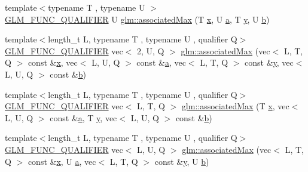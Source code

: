 \begin{DoxyCompactItemize}
\item 
{\footnotesize template$<$typename T , typename U $>$ }\\\hyperlink{setup_8hpp_a33fdea6f91c5f834105f7415e2a64407}{G\+L\+M\+\_\+\+F\+U\+N\+C\+\_\+\+Q\+U\+A\+L\+I\+F\+I\+ER} U \hyperlink{group__gtx__associated__min__max_ga7d9c8785230c8db60f72ec8975f1ba45}{glm\+::associated\+Max} (T \hyperlink{_s_d_l__opengl_8h_ad0e63d0edcdbd3d79554076bf309fd47}{x}, U \hyperlink{_s_d_l__opengl__glext_8h_a3309789fc188587d666cda5ece79cf82}{a}, T \hyperlink{_s_d_l__opengl_8h_a1675d9d7bb68e1657ff028643b4037e3}{y}, U \hyperlink{_s_d_l__opengl__glext_8h_a0f71581a41fd2264c8944126dabbd010}{b})
\item 
{\footnotesize template$<$length\+\_\+t L, typename T , typename U , qualifier Q$>$ }\\\hyperlink{setup_8hpp_a33fdea6f91c5f834105f7415e2a64407}{G\+L\+M\+\_\+\+F\+U\+N\+C\+\_\+\+Q\+U\+A\+L\+I\+F\+I\+ER} vec$<$ 2, U, Q $>$ \hyperlink{group__gtx__associated__min__max_ga5c6758bc50aa7fbe700f87123a045aad}{glm\+::associated\+Max} (vec$<$ L, T, Q $>$ const \&\hyperlink{_s_d_l__opengl_8h_ad0e63d0edcdbd3d79554076bf309fd47}{x}, vec$<$ L, U, Q $>$ const \&\hyperlink{_s_d_l__opengl__glext_8h_a3309789fc188587d666cda5ece79cf82}{a}, vec$<$ L, T, Q $>$ const \&\hyperlink{_s_d_l__opengl_8h_a1675d9d7bb68e1657ff028643b4037e3}{y}, vec$<$ L, U, Q $>$ const \&\hyperlink{_s_d_l__opengl__glext_8h_a0f71581a41fd2264c8944126dabbd010}{b})
\item 
{\footnotesize template$<$length\+\_\+t L, typename T , typename U , qualifier Q$>$ }\\\hyperlink{setup_8hpp_a33fdea6f91c5f834105f7415e2a64407}{G\+L\+M\+\_\+\+F\+U\+N\+C\+\_\+\+Q\+U\+A\+L\+I\+F\+I\+ER} vec$<$ L, T, Q $>$ \hyperlink{group__gtx__associated__min__max_ga0d169d6ce26b03248df175f39005d77f}{glm\+::associated\+Max} (T \hyperlink{_s_d_l__opengl_8h_ad0e63d0edcdbd3d79554076bf309fd47}{x}, vec$<$ L, U, Q $>$ const \&\hyperlink{_s_d_l__opengl__glext_8h_a3309789fc188587d666cda5ece79cf82}{a}, T \hyperlink{_s_d_l__opengl_8h_a1675d9d7bb68e1657ff028643b4037e3}{y}, vec$<$ L, U, Q $>$ const \&\hyperlink{_s_d_l__opengl__glext_8h_a0f71581a41fd2264c8944126dabbd010}{b})
\item 
{\footnotesize template$<$length\+\_\+t L, typename T , typename U , qualifier Q$>$ }\\\hyperlink{setup_8hpp_a33fdea6f91c5f834105f7415e2a64407}{G\+L\+M\+\_\+\+F\+U\+N\+C\+\_\+\+Q\+U\+A\+L\+I\+F\+I\+ER} vec$<$ L, U, Q $>$ \hyperlink{group__gtx__associated__min__max_ga4086269afabcb81dd7ded33cb3448653}{glm\+::associated\+Max} (vec$<$ L, T, Q $>$ const \&\hyperlink{_s_d_l__opengl_8h_ad0e63d0edcdbd3d79554076bf309fd47}{x}, U \hyperlink{_s_d_l__opengl__glext_8h_a3309789fc188587d666cda5ece79cf82}{a}, vec$<$ L, T, Q $>$ const \&\hyperlink{_s_d_l__opengl_8h_a1675d9d7bb68e1657ff028643b4037e3}{y}, U \hyperlink{_s_d_l__opengl__glext_8h_a0f71581a41fd2264c8944126dabbd010}{b})

\end{DoxyCompactItemize}
